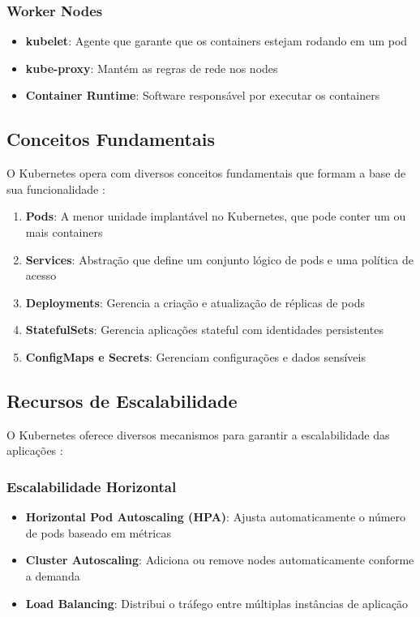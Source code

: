 \subsubsection{Worker Nodes}
\begin{itemize}
\item \textbf{kubelet}: Agente que garante que os containers estejam rodando em um pod
\item \textbf{kube-proxy}: Mantém as regras de rede nos nodes
\item \textbf{Container Runtime}: Software responsável por executar os containers
\end{itemize}

\subsection{Conceitos Fundamentais}

O Kubernetes opera com diversos conceitos fundamentais que formam a base de sua funcionalidade \cite{hightower2019kubernetes}:

\begin{enumerate}
\item \textbf{Pods}: A menor unidade implantável no Kubernetes, que pode conter um ou mais containers
\item \textbf{Services}: Abstração que define um conjunto lógico de pods e uma política de acesso
\item \textbf{Deployments}: Gerencia a criação e atualização de réplicas de pods
\item \textbf{StatefulSets}: Gerencia aplicações stateful com identidades persistentes
\item \textbf{ConfigMaps e Secrets}: Gerenciam configurações e dados sensíveis
\end{enumerate}

\subsection{Recursos de Escalabilidade}

O Kubernetes oferece diversos mecanismos para garantir a escalabilidade das aplicações \cite{luksa2021kubernetes}:

\subsubsection{Escalabilidade Horizontal}
\begin{itemize}
\item \textbf{Horizontal Pod Autoscaling (HPA)}: Ajusta automaticamente o número de pods baseado em métricas
\item \textbf{Cluster Autoscaling}: Adiciona ou remove nodes automaticamente conforme a demanda
\item \textbf{Load Balancing}: Distribui o tráfego entre múltiplas instâncias de aplicação
\end{itemize}

